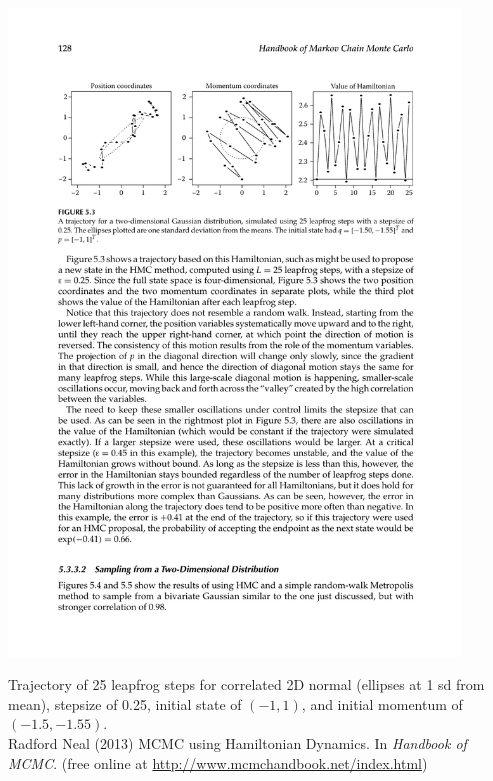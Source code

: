 \documentclass[10pt]{report}
\begin{document}
\begin{center}
\includegraphics[width=0.9\textwidth]{img/neal-leapfrog.pdf}
\end{center}
\vspace*{-8pt}
\begin{subitemize}
\item \small Trajectory of 25 leapfrog steps for correlated 2D normal (ellipses at 1 sd
  from mean), stepsize of 0.25, initial state of $(-1,1)$, and initial
  momentum of $(-1.5,-1.55)$.  
\\[12pt]
\footnotesize Radford Neal (2013) MCMC using Hamiltonian Dynamics. In {\slshape Handbook
of MCMC}. (free online at \url{http://www.mcmchandbook.net/index.html})
\end{subitemize}
\end{document}
